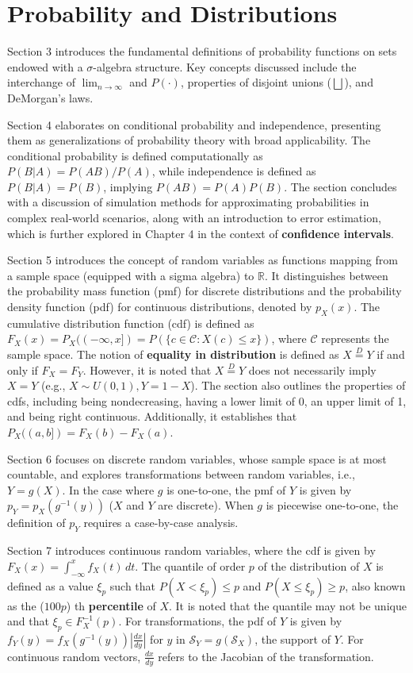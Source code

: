 \section{Probability and Distributions}

Section 3 introduces the fundamental definitions of probability functions on sets endowed with a $\sigma$-algebra structure. Key concepts discussed include the interchange of $\lim_{n \to \infty}$ and $P(\cdot)$, properties of disjoint unions ($\bigsqcup$), and DeMorgan's laws.

Section 4 elaborates on conditional probability and independence, presenting them as generalizations of probability theory with broad applicability. The conditional probability is defined computationally as $P(B|A)=P(AB)/P(A)$, while independence is defined as $P(B|A)=P(B)$, implying $P(AB)=P(A)P(B)$. The section concludes with a discussion of simulation methods for approximating probabilities in complex real-world scenarios, along with an introduction to error estimation, which is further explored in Chapter 4 in the context of \textbf{confidence intervals}.

Section 5 introduces the concept of random variables as functions mapping from a sample space (equipped with a sigma algebra) to $\mathbb{R}$. It distinguishes between the probability mass function (pmf) for discrete distributions and the probability density function (pdf) for continuous distributions, denoted by $p_{X}(x)$. The cumulative distribution function (cdf) is defined as $F_{X}(x)=P_{X}((-\infty,x])=P(\{ c\in \mathcal{C}:X(c)\le x \})$, where $\mathcal{C}$ represents the sample space. The notion of \textbf{equality in distribution} is defined as $X\overset{D}{=}Y$ if and only if $F_{X}=F_{Y}$. However, it is noted that $X\overset{D}{=}Y$ does not necessarily imply $X=Y$ (e.g., $X\sim U(0,1),Y=1-X$). The section also outlines the properties of cdfs, including being nondecreasing, having a lower limit of 0, an upper limit of 1, and being right continuous. Additionally, it establishes that $P_{X}((a,b])=F_{X}(b)-F_{X}(a)$.

Section 6 focuses on discrete random variables, whose sample space is at most countable, and explores transformations between random variables, i.e., $Y=g(X)$. In the case where $g$ is one-to-one, the pmf of $Y$ is given by $p_{Y}=p_{X}(g^{-1}(y))$ ($X$ and $Y$ are discrete). When $g$ is piecewise one-to-one, the definition of $p_{Y}$ requires a case-by-case analysis.

Section 7 introduces continuous random variables, where the cdf is given by $F_{X}(x)=\int_{-\infty}^{x} f_{X}(t) \, dt$. The quantile of order $p$ of the distribution of $X$ is defined as a value $\xi_{p}$ such that $P(X<\xi_{p})\leq p$ and $P(X\leq \xi_{p})\geq p$, also known as the ($100p$) th \textbf{percentile} of $X$. It is noted that the quantile may not be unique and that $\xi_{p}\in F^{-1}_{X}(p)$. For transformations, the pdf of $Y$ is given by $f_{Y}(y)=f_{X}(g^{-1}(y))\left\lvert \frac{dx}{dy} \right\rvert$ for $y$ in $\mathcal{S}_{Y}=g(\mathcal{S}_{X})$, the support of $Y$. For continuous random vectors, $\frac{dx}{dy}$ refers to the Jacobian of the transformation.

